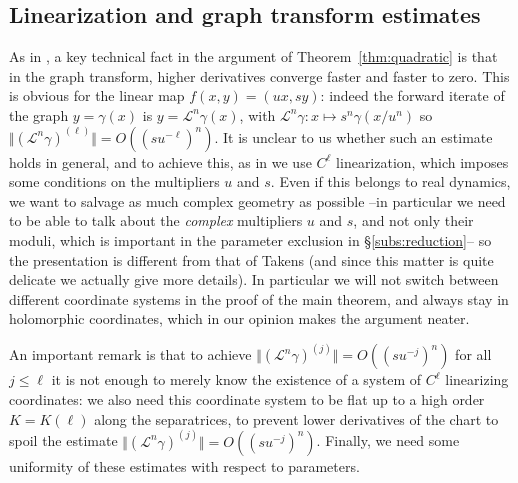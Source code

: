 \documentclass[11pt, oneside]{amsart}
\newcommand{\smallnorm}[1]{\Vert #1\Vert}
\newcommand{\el}{\mathcal{L}}
\theoremstyle{remark}
\theoremstyle{definition}
\theoremstyle{theorem}
\begin{document}
\subsection{Linearization and graph transform estimates}\label{subs:graph_transform}
As in \cite[\S 3]{takens}, a key technical fact in the argument of Theorem~\ref{thm:quadratic} is that in the graph transform, 
  higher derivatives converge faster and  faster to zero. This is obvious for the linear map 
$f(x,y) = (ux, sy)$: indeed the forward iterate of the graph $y  =\gamma(x)$ is $y = \el^n\gamma (x)$, 
with $\el^n\gamma : x\mapsto s^n \gamma( x/u^n)$ so $\smallnorm {(\el^n\gamma )^{(\ell)} }  = O((su^{-\ell})^n)$. 
It is unclear to us whether such an 
 estimate holds in general, and to achieve this, as in \cite{takens}
we use $C^\ell$ linearization, which
 imposes some conditions on the multipliers $u$ and $s$. 
 Even if this belongs to real dynamics, we want to salvage as much complex geometry as possible 
 --in particular we  need to be able to talk about the \emph{complex} multipliers $u$ and $s$, and not only their moduli, which is important in the parameter exclusion in \S\ref{subs:reduction}--
 so the presentation is different from that of Takens (and since this matter is  quite delicate   
 we  actually give more details). 
 In particular we will not switch between different coordinate systems  in the proof of the main theorem, 
 and always stay in holomorphic coordinates, 
 which in our opinion makes the argument neater. 
 
 An important remark is that to achieve 
 $\smallnorm {(\el^n\gamma)^{(j)} }  = O((su^{-j})^n)$ for all $j\leq \ell$ it is not enough to merely know the existence of 
 a system of $C^\ell$ linearizing coordinates: we also need this coordinate system 
  to be flat up to a high  order $K=K(\ell)$ along the separatrices, to 
 prevent lower derivatives of the chart  to spoil the estimate 
 $\smallnorm {(\el^n\gamma)^{(j)} }  = O((su^{-j})^n)$.
 Finally, we need some uniformity of these estimates with respect to parameters. 
\end{document}
